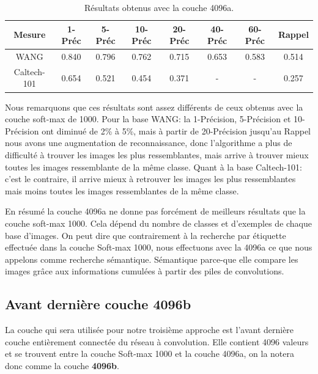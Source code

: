 \begin{table}[H]
\begin{center}
\begin{tabular}{|c|c|c|c|c|c|c|c|}
\hline
	Mesure & 1-Préc & 5-Préc & 10-Préc & 20-Préc & 40-Préc & 60-Préc & Rappel\\
\hline
	WANG & 0.840 & 0.796 & 0.762 & 0.715 & 0.653 & 0.583 & 0.514\\
\hline
	Caltech-101 & 0.654 & 0.521 & 0.454 & 0.371 & - & - & 0.257\\
\hline
\end{tabular}
\end{center}
\caption{Résultats obtenus avec la couche 4096a.}
\end{table}

	Nous remarquons que ces résultats sont assez différents de ceux obtenus avec la couche soft-max de 1000. Pour la base WANG: la 1-Précision, 5-Précision et 10-Précision ont diminué de 2\% à 5\%, mais à partir de 20-Précision jusqu'au Rappel nous avons une augmentation de reconnaissance, donc l'algorithme a plus de difficulté à trouver les images les plus ressemblantes, mais arrive à trouver mieux toutes les images ressemblante de la même classe.
	Quant à la base Caltech-101: c'est le contraire, il arrive mieux à retrouver les images les plus ressemblantes mais moins toutes les images ressemblantes de la même classe.
	
	En résumé la couche 4096a ne donne pas forcément de meilleurs résultats que la couche soft-max 1000. Cela dépend du nombre de classes et d'exemples de chaque base d'images. On peut dire que contrairement à la recherche par étiquette effectuée dans la couche Soft-max 1000, nous effectuons avec la 4096a ce que nous appelons comme recherche sémantique. Sémantique parce-que elle compare les images grâce aux informations cumulées à partir des piles de convolutions.


\subsection{Avant dernière couche 4096b}
	La couche qui sera utilisée pour notre troisième approche est l'avant dernière couche entièrement connectée du réseau à convolution. Elle contient 4096 valeurs et se trouvent entre la couche Soft-max 1000 et la couche 4096a, on la notera donc comme la couche \textbf{4096b}.
	
